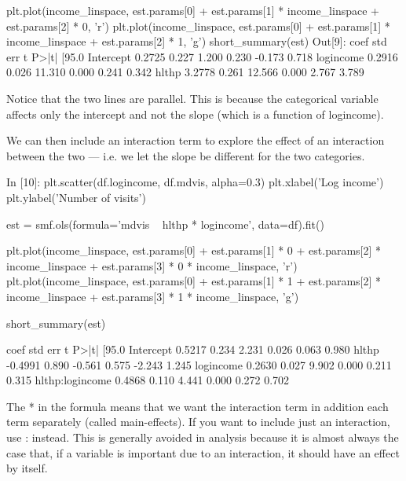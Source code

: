 \begin{frame}[fragile]
	\Large
plt.plot(income_linspace, est.params[0] + est.params[1] * income_linspace + est.params[2] * 0, 'r')
plt.plot(income_linspace, est.params[0] + est.params[1] * income_linspace + est.params[2] * 1, 'g')
short_summary(est)
Out[9]:
coef	std err	t	P>|t|	[95.0%
Intercept	0.2725	0.227	1.200	0.230	-0.173 0.718
logincome	0.2916	0.026	11.310	0.000	0.241 0.342
hlthp	3.2778	0.261	12.566	0.000	2.767 3.789
\end{frame}

\begin{frame}[fragile]
	\Large
Notice that the two lines are parallel. This is because the categorical variable affects only the intercept and not the slope (which is a function of logincome).

We can then include an interaction term to explore the effect of an interaction between the two — i.e. we let the slope be different for the two categories.
\end{frame}

\begin{frame}[fragile]
	\Large
In [10]:
plt.scatter(df.logincome, df.mdvis, alpha=0.3)
plt.xlabel('Log income')
plt.ylabel('Number of visits')

est = smf.ols(formula='mdvis ~ hlthp * logincome', data=df).fit()

plt.plot(income_linspace, est.params[0] + est.params[1] * 0 + est.params[2] * income_linspace + 
         est.params[3] * 0 * income_linspace, 'r')
plt.plot(income_linspace, est.params[0] + est.params[1] * 1 + est.params[2] * income_linspace + 
         est.params[3] * 1 * income_linspace, 'g')

short_summary(est)
\end{frame}

\begin{frame}[fragile]
	\Large
coef	std err	t	P>|t|	[95.0%
Intercept	0.5217	0.234	2.231	0.026	0.063 0.980
hlthp	-0.4991	0.890	-0.561	0.575	-2.243 1.245
logincome	0.2630	0.027	9.902	0.000	0.211 0.315
hlthp:logincome	0.4868	0.110	4.441	0.000	0.272 0.702

The * in the formula means that we want the interaction term in addition each term separately (called main-effects). If you want to include just an interaction, use : instead. This is generally avoided in analysis because it is almost always the case that, if a variable is important due to an interaction, it should have an effect by itself.
\end{frame}

